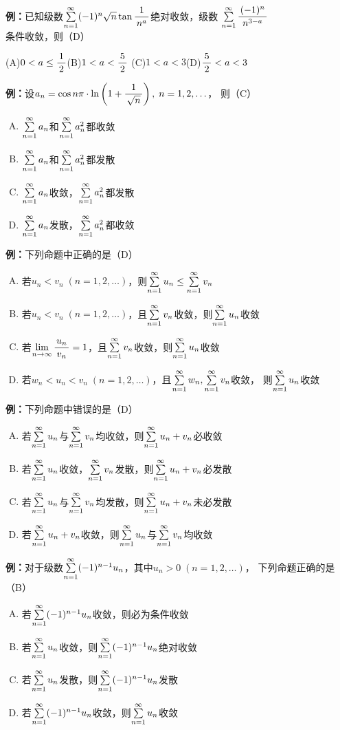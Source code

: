 {\bf 例：}已知级数$\sumn(-1)^n\sqrt n\tan\df1{n^a}$绝对收敛，级数
$\sumn\df{(-1)^n}{n^{3-a}}$条件收敛，则（D）

\quad (A)\;$0<a\leq \df12$\quad(B)\;$1<a<\df52$
\quad (C)\;$1<a<3$\quad(D)\;$\df52<a<3$

{\bf 例：}设$a_n=\cos n\pi\cdot\ln\left(1+\df1{\sqrt n}\right),\;n=1,2,\ldots$，
则（C）
\begin{enumerate}[(A)]
  \setlength{\itemindent}{1cm}
  \item $\sumn a_n$和$\sumn a_n^2$都收敛
  \item $\sumn a_n$和$\sumn a_n^2$都发散
  \item $\sumn a_n$收敛，$\sumn a_n^2$都发散
  \item $\sumn a_n$发散，$\sumn a_n^2$都收敛
\end{enumerate}

{\bf 例：}下列命题中正确的是（D）
\begin{enumerate}[(A)]
  \setlength{\itemindent}{1cm}
  \item 若$u_n<v_n\;(n=1,2,\ldots)$，则$\sumn u_n\leq \sumn v_n$
  \item 若$u_n<v_n\;(n=1,2,\ldots)$，且$\sumn v_n$收敛，则$\sumn u_n$收敛
  \item 若$\limn\df{u_n}{v_n}=1$，且$\sumn v_n$收敛，则$\sumn u_n$收敛
  \item 若$w_n<u_n<v_n\;(n=1,2,\ldots)$，且$\sumn w_n,\sumn v_n$收敛，
  则$\sumn u_n$收敛
\end{enumerate}

{\bf 例：}下列命题中错误的是（D）
\begin{enumerate}[(A)]
  \setlength{\itemindent}{1cm}
  \item 若$\sumn u_n$与$\sumn v_n$均收敛，则$\sumn u_n+v_n$必收敛
  \item 若$\sumn u_n$收敛，$\sumn v_n$发散，则$\sumn u_n+v_n$必发散
  \item 若$\sumn u_n$与$\sumn v_n$均发散，则$\sumn u_n+v_n$未必发散
  \item 若$\sumn u_n+v_n$收敛，则$\sumn u_n$与$\sumn v_n$均收敛
\end{enumerate}


{\bf 例：}对于级数$\sumn(-1)^{n-1}u_n$，其中$u_n>0\;(n=1,2,\ldots)$，
下列命题正确的是（B）
\begin{enumerate}[(A)]
  \setlength{\itemindent}{1cm}
  \item 若$\sumn(-1)^{n-1}u_n$收敛，则必为条件收敛
  \item 若$\sumn u_n$收敛，则$\sumn(-1)^{n-1}u_n$绝对收敛
  \item 若$\sumn u_n$发散，则$\sumn(-1)^{n-1}u_n$发散
  \item 若$\sumn (-1)^{n-1} u_n$收敛，则$\sumn u_n$收敛
\end{enumerate}

